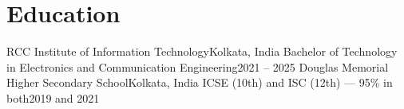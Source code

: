 \section{Education}
  \resumeSubHeadingListStart
    \resumeSubheading
      {RCC Institute of Information Technology}{Kolkata, India}
      {Bachelor of Technology in Electronics and Communication Engineering}{2021 -- 2025}
    \resumeSubheading
      {Douglas Memorial Higher Secondary School}{Kolkata, India}
      {ICSE (10th) and ISC (12th) --- 95\% in both}{2019 and 2021}
  \resumeSubHeadingListEnd
